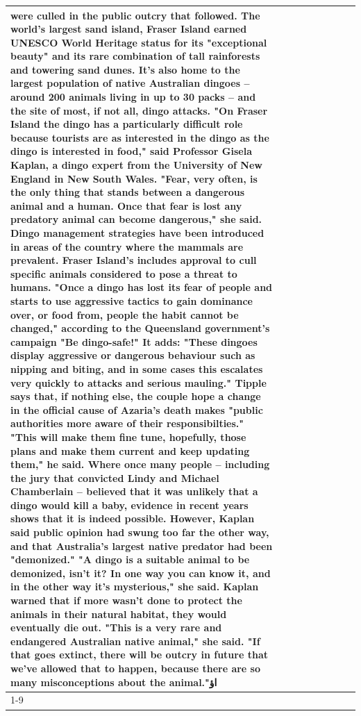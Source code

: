 \begin{table}[H]
\begin{tabular}{lllrlllll}
were culled in the public outcry that followed. The world's largest sand island, Fraser Island earned UNESCO World Heritage status for its "exceptional beauty" and its rare combination of tall rainforests and towering sand dunes. It's also home to the largest population of native Australian dingoes -- around 200 animals living in up to 30 packs -- and the site of most, if not all, dingo attacks. "On Fraser Island the dingo has a particularly difficult role because tourists are as interested in the dingo as the dingo is interested in food," said Professor Gisela Kaplan, a dingo expert from the University of New England in New South Wales. "Fear, very often, is the only thing that stands between a dangerous animal and a human. Once that fear is lost any predatory animal can become dangerous," she said. Dingo management strategies have been introduced in areas of the country where the mammals are prevalent. Fraser Island's includes approval to cull specific animals considered to pose a threat to humans. "Once a dingo has lost its fear of people and starts to use aggressive tactics to gain dominance over, or food from, people the habit cannot be changed," according to the Queensland government's campaign "Be dingo-safe!" It adds: "These dingoes display aggressive or dangerous behaviour such as nipping and biting, and in some cases this escalates very quickly to attacks and serious mauling." Tipple says that, if nothing else, the couple hope a change in the official cause of Azaria's death makes "public authorities more aware of their responsibilties." "This will make them fine tune, hopefully, those plans and make them current and keep updating them," he said. Where once many people -- including the jury that convicted Lindy and Michael Chamberlain -- believed that it was unlikely that a dingo would kill a baby, evidence in recent years shows that it is indeed possible. However, Kaplan said public opinion had swung too far the other way, and that Australia's largest native predator had been "demonized." "A dingo is a suitable animal to be demonized, isn't it? In one way you can know it, and in the other way it's mysterious," she said. Kaplan warned that if more wasn't done to protect the animals in their natural habitat, they would eventually die out. "This is a very rare and endangered Australian native animal," she said. "If that goes extinct, there will be outcry in future that we've allowed that to happen, because there are so many misconceptions about the animal."اؤ \\
\cline{1-9}

\end{tabular}
\end{table}
